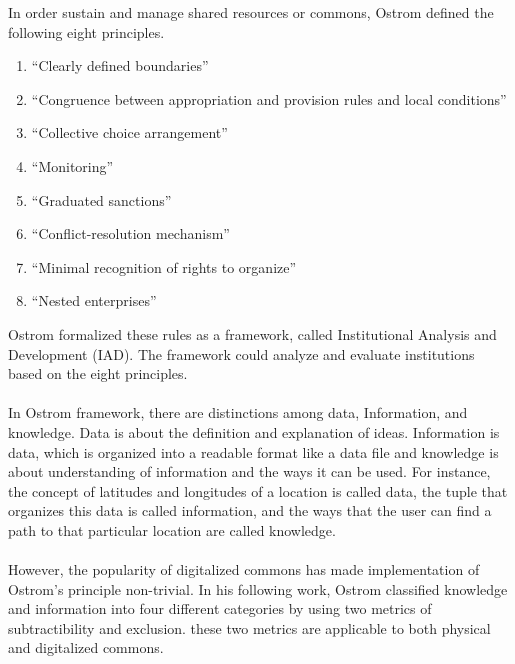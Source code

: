 \documentclass [12pt]{article} \usepackage{multicol}
\begin{document}
In order sustain and manage shared resources or commons, Ostrom
defined the following eight principles. \begin{enumerate} \item
``Clearly defined boundaries''\item ``Congruence between
appropriation and provision rules and local conditions'' \item
``Collective choice arrangement'' \item ``Monitoring'' \item
``Graduated sanctions'' \item ``Conflict-resolution mechanism''
\item  ``Minimal recognition of rights to organize'' \item  ``Nested
enterprises'' \end{enumerate} 
Ostrom formalized these rules as a framework, called Institutional
Analysis and Development (IAD). The framework could analyze and
evaluate institutions based on the eight principles.\paragraph{} In Ostrom
framework, there are distinctions among data, Information, and
knowledge. Data is about the definition and explanation of
ideas. Information is data, which is organized into a readable
format like a data file and knowledge is about understanding of
information and the ways it can be used. For instance, the concept
of latitudes and longitudes of a location is called data, the tuple
that organizes this data is called information, and the ways that
the user can find a path to that particular location are called knowledge.
 \paragraph{} However, the popularity of digitalized commons has made implementation of
Ostrom’s principle non-trivial. In his following work, Ostrom classified knowledge and
information into four different categories by using two metrics of
subtractibility and exclusion. these two metrics are applicable to both
physical and digitalized commons.
\end{document}
